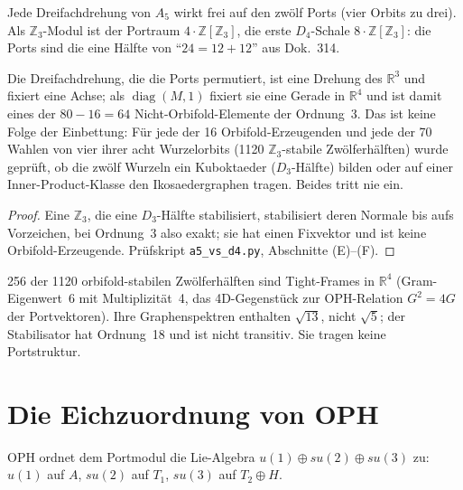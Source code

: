 \begin{theorem}
Jede Dreifachdrehung von $A_5$ wirkt frei auf den zwölf Ports (vier Orbits
zu drei). Als $\mathbb{Z}_3$-Modul ist der Portraum $4\cdot\mathbb{Z}[\mathbb{Z}_3]$,
die erste $D_4$-Schale $8\cdot\mathbb{Z}[\mathbb{Z}_3]$: die Ports sind die
eine Hälfte von \enquote{$24=12+12$} aus Dok.~314.
\end{theorem}

\begin{theorem}\label{thm:neg}
Die Dreifachdrehung, die die Ports permutiert, ist eine Drehung des
$\mathbb{R}^3$ und fixiert eine Achse; als $\operatorname{diag}(M,1)$ fixiert sie
eine Gerade in $\mathbb{R}^4$ und ist damit eines der $80-16=64$
Nicht-Orbifold-Elemente der Ordnung~3. Das ist keine Folge der Einbettung:
Für jede der 16 Orbifold-Erzeugenden und jede der 70 Wahlen von vier ihrer
acht Wurzelorbits (1120 $\mathbb{Z}_3$-stabile Zwölferhälften) wurde geprüft,
ob die zwölf Wurzeln ein Kuboktaeder ($D_3$-Hälfte) bilden oder auf einer
Inner-Product-Klasse den Ikosaedergraphen tragen. Beides tritt nie ein.
\end{theorem}

\begin{proof}
Eine $\mathbb{Z}_3$, die eine $D_3$-Hälfte stabilisiert, stabilisiert deren
Normale bis aufs Vorzeichen, bei Ordnung~3 also exakt; sie hat einen
Fixvektor und ist keine Orbifold-Erzeugende. Prüfskript
\texttt{a5\_vs\_d4.py}, Abschnitte (E)--(F).
\end{proof}

\begin{remark}[Nebenbefund, \KM]
256 der 1120 orbifold-stabilen Zwölferhälften sind Tight-Frames in
$\mathbb{R}^4$ (Gram-Eigenwert~6 mit Multiplizität~4, das 4D-Gegenstück zur
OPH-Relation $G^2=4G$ der Portvektoren). Ihre Graphenspektren enthalten
$\sqrt{13}$, nicht $\sqrt5$; der Stabilisator hat Ordnung~18 und ist nicht
transitiv. Sie tragen keine Portstruktur.
\end{remark}

\section{Die Eichzuordnung von OPH}

OPH ordnet dem Portmodul die Lie-Algebra $u(1)\oplus su(2)\oplus su(3)$ zu:
$u(1)$ auf $A$, $su(2)$ auf $T_1$, $su(3)$ auf $T_2\oplus H$.

